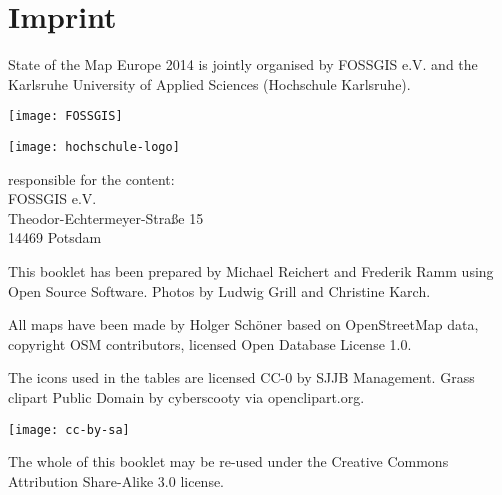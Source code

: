 \newpage
\section*{Imprint}
\label{imprint}


\begin{raggedright}
State of the Map Europe 2014 is jointly organised by FOSSGIS
e.V. and the Karlsruhe University of Applied Sciences
(Hochschule Karlsruhe).

\vspace{0.5em}
 \begin{minipage}[htbp]{0.47\textwidth}
	\texttt{[image: FOSSGIS]}
\end{minipage}
\hfill
\begin{minipage}[hbtp]{0.47\textwidth}
\texttt{[image: hochschule-logo]}
\end{minipage}

\vspace{1.6em}
\noindent responsible for the content:\\
FOSSGIS e.V.\\
Theodor-Echtermeyer-Straße 15\\
14469 Potsdam

\vspace{1em}
\noindent This booklet has been prepared by Michael Reichert and Frederik
Ramm using Open Source Software. Photos by Ludwig Grill and 
Christine Karch.

\vspace{0.5em}

\noindent All maps have been made by Holger Schöner based on Open\-Street\-Map
data, copyright OSM contributors, licensed Open Database License 1.0.

\vspace{0.5em}
\noindent The icons used in the tables are licensed CC-0 by SJJB Management. Grass 
clipart Public Domain by cyberscooty via openclipart.org.


\vspace{1em}
\noindent \begin{minipage}[htbp]{0.2\textwidth}
\noindent\texttt{[image: cc-by-sa]}
\end{minipage}
\hfill
\begin{minipage}[hbtp]{0.74\textwidth}
The whole of this booklet may be re-used under the Creative
Commons Attribution Share-Alike 3.0 license.
\end{minipage}
\end{raggedright}


